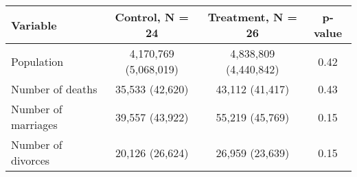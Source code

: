 
\begin{tabular}{lccc}
\toprule
Variable & Control, N = 24 & Treatment, N = 26 & p-value\\
\midrule
Population & 4,170,769 (5,068,019) & 4,838,809 (4,440,842) & 0.42\\
Number of deaths & 35,533 (42,620) & 43,112 (41,417) & 0.43\\
Number of marriages & 39,557 (43,922) & 55,219 (45,769) & 0.15\\
Number of divorces & 20,126 (26,624) & 26,959 (23,639) & 0.15\\
\bottomrule
\end{tabular}